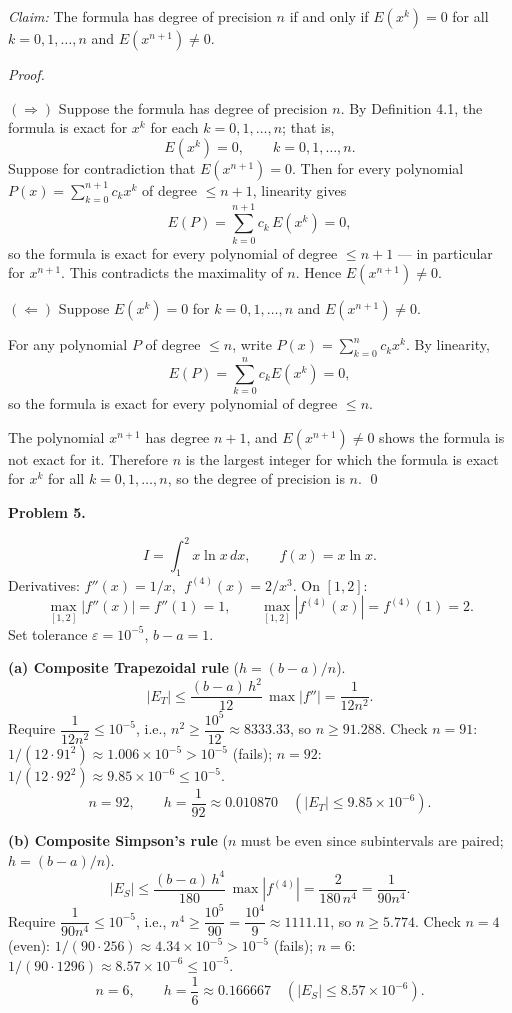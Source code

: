 \documentclass[12pt,letterpaper]{article}
\begin{document}
\textit{Claim:} The formula has degree of precision $n$ if and only if $E(x^k) = 0$ for all $k = 0, 1, \ldots, n$ and $E(x^{n+1}) \ne 0$.

\textit{Proof.}

$(\Longrightarrow)$ Suppose the formula has degree of precision $n$. By Definition 4.1, the formula is exact for $x^k$ for each $k = 0, 1, \ldots, n$; that is,
\[
E(x^k) = 0, \qquad k = 0, 1, \ldots, n.
\]
Suppose for contradiction that $E(x^{n+1}) = 0$. Then for every polynomial $P(x) = \sum_{k=0}^{n+1} c_k x^k$ of degree $\le n+1$, linearity gives
\[
E(P) = \sum_{k=0}^{n+1} c_k\, E(x^k) = 0,
\]
so the formula is exact for every polynomial of degree $\le n+1$ — in particular for $x^{n+1}$. This contradicts the maximality of $n$. Hence $E(x^{n+1}) \ne 0$.

$(\Longleftarrow)$ Suppose $E(x^k) = 0$ for $k = 0, 1, \ldots, n$ and $E(x^{n+1}) \ne 0$.

For any polynomial $P$ of degree $\le n$, write $P(x) = \sum_{k=0}^{n} c_k x^k$. By linearity,
\[
E(P) = \sum_{k=0}^{n} c_k E(x^k) = 0,
\]
so the formula is exact for every polynomial of degree $\le n$.

The polynomial $x^{n+1}$ has degree $n+1$, and $E(x^{n+1}) \ne 0$ shows the formula is not exact for it. Therefore $n$ is the largest integer for which the formula is exact for $x^k$ for all $k = 0, 1, \ldots, n$, so the degree of precision is $n$. \qed



\textbf{Problem 5.}

\[
I = \int_1^{2} x \ln x\,dx, \qquad f(x) = x \ln x.
\]
Derivatives: $f''(x) = 1/x$, $\;f^{(4)}(x) = 2/x^3$. On $[1,2]$:
\[
\max_{[1,2]} |f''(x)| = f''(1) = 1, \qquad \max_{[1,2]} |f^{(4)}(x)| = f^{(4)}(1) = 2.
\]
Set tolerance $\varepsilon = 10^{-5}$, $b - a = 1$.

\textbf{(a) Composite Trapezoidal rule} ($h = (b-a)/n$).
\[
|E_T| \le \frac{(b-a)\,h^2}{12}\,\max|f''| = \frac{1}{12 n^2}.
\]
Require $\dfrac{1}{12 n^2} \le 10^{-5}$, i.e., $n^2 \ge \dfrac{10^5}{12} \approx 8333.33$, so $n \ge 91.288$.
Check $n = 91$: $1/(12 \cdot 91^2) \approx 1.006 \times 10^{-5} > 10^{-5}$ (fails); $n = 92$: $1/(12 \cdot 92^2) \approx 9.85 \times 10^{-6} \le 10^{-5}$.
\[
\boxed{n = 92, \qquad h = \frac{1}{92} \approx 0.010870 \quad (|E_T| \le 9.85 \times 10^{-6}).}
\]

\textbf{(b) Composite Simpson's rule} ($n$ must be even since subintervals are paired; $h = (b-a)/n$).
\[
|E_S| \le \frac{(b-a)\,h^4}{180}\,\max|f^{(4)}| = \frac{2}{180\, n^4} = \frac{1}{90 n^4}.
\]
Require $\dfrac{1}{90 n^4} \le 10^{-5}$, i.e., $n^4 \ge \dfrac{10^5}{90} = \dfrac{10^4}{9} \approx 1111.11$, so $n \ge 5.774$.
Check $n = 4$ (even): $1/(90 \cdot 256) \approx 4.34 \times 10^{-5} > 10^{-5}$ (fails); $n = 6$: $1/(90 \cdot 1296) \approx 8.57 \times 10^{-6} \le 10^{-5}$.
\[
\boxed{n = 6, \qquad h = \frac{1}{6} \approx 0.166667 \quad (|E_S| \le 8.57 \times 10^{-6}).}
\]
\end{document}
